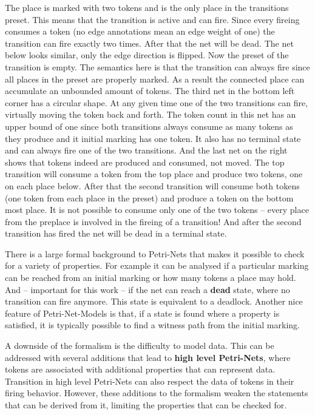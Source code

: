 The place is marked with two tokens and is the only place in the transitions preset.
This means that the transition is active and can fire.
Since every fireing consumes a token (no edge annotations mean an edge weight of one) the transition can fire exactly two times.
After that the net will be dead.
The net below looks similar, only the edge direction is flipped.
Now the preset of the transition is empty.
The semantics here is that the transition can always fire since all places in the preset are properly marked.
As a result the connected place can accumulate an unbounded amount of tokens.
The third net in the bottom left corner has a circular shape.
At any given time one of the two transitions can fire, virtually moving the token back and forth.
The token count in this net has an upper bound of one since both transitions always consume as many tokens as they produce and it initial marking has one token.
It also has no terminal state and can always fire one of the two transitions.
And the last net on the right shows that tokens indeed are produced and consumed, not moved.
The top transition will consume a token from the top place and produce two tokens, one on each place below.
After that the second transition will consume both tokens (one token from each place in the preset) and produce a token on the bottom most place.
It is not possible to consume only one of the two tokens -- every place from the preplace is involved in the fireing of a transition!
And after the second transition has fired the net will be dead in a terminal state.

There is a large formal background to Petri-Nets that makes it possible to check for a variety of properties.
For example it can be analysed if a particular marking can be reached from an initial marking or how many tokens a place may hold.
And -- important for this work -- if the net can reach a \textbf{dead} state, where no transition can fire anymore.
This state is equivalent to a deadlock.
Another nice feature of Petri-Net-Models is that, if a state is found where a property is satisfied, it is typically possible to find a witness path from the initial marking.


A downside of the formalism is the difficulty to model data.
This can be addressed with several additions that lead to \textbf{high level Petri-Nets}, where tokens are associated with additional properties that can represent data.
Transition in high level Petri-Nets can also respect the data of tokens in their firing behavior.
However, these additions to the formalism weaken the statements that can be derived from it, limiting the properties that can be checked for.

